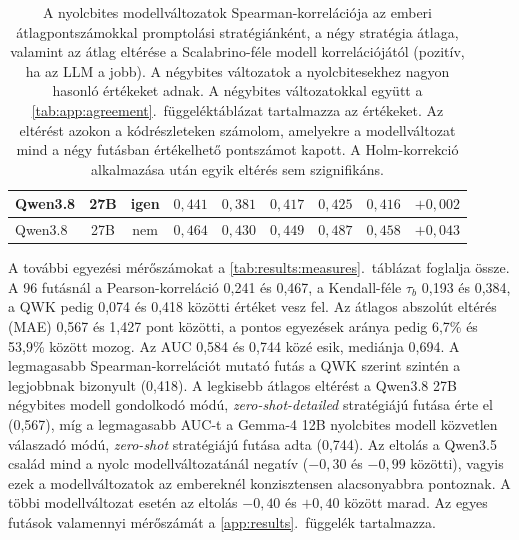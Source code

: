 \documentclass[
]{elteikthesis}[2024/04/26]
\begin{document}
\begin{table}[htbp]
{\begin{tabular}{ | l | c | c | r | r | r | r | r | r | }
		\hline
		Qwen3.8 & 27B & igen & $0{,}441$ & $0{,}381$ & $0{,}417$ & $0{,}425$ & $0{,}416$ & $+0{,}002$ \\
		\hline
		Qwen3.8 & 27B & nem & $0{,}464$ & $0{,}430$ & $0{,}449$ & $0{,}487$ & $0{,}458$ & $+0{,}043$ \\
		\hline
	\end{tabular}}
	\caption[A modellváltozatok Spearman-korrelációja]{A nyolcbites modellváltozatok Spearman-korrelációja az emberi
	átlagpontszámokkal promptolási stratégiánként, a négy stratégia átlaga, valamint az átlag eltérése a
	Scalabrino-féle modell korrelációjától (pozitív, ha az LLM a jobb).
	A négybites változatok a nyolcbitesekhez nagyon hasonló értékeket adnak. A négybites változatokkal
	együtt a \ref{tab:app:agreement}.~függeléktáblázat tartalmazza az értékeket.
	Az eltérést azokon a kódrészleteken számolom, amelyekre a modellváltozat mind a négy futásban
	értékelhető pontszámot kapott.
	A Holm-korrekció alkalmazása után egyik eltérés sem szignifikáns.}
	\label{tab:results:agreement}
\end{table}

A további egyezési mérőszámokat a \ref{tab:results:measures}.~táblázat foglalja
össze. A 96 futásnál a Pearson-korreláció 0,241 és 0,467, a Kendall-féle
$\tau_b$ 0,193 és 0,384, a QWK pedig 0,074 és 0,418 közötti értéket vesz fel. Az
átlagos abszolút eltérés (MAE) 0,567 és 1,427 pont közötti, a pontos egyezések
aránya pedig 6,7\% és 53,9\% között mozog. Az AUC 0,584 és 0,744 közé esik,
mediánja 0,694. A legmagasabb Spearman-korrelációt mutató futás a QWK szerint
szintén a legjobbnak bizonyult (0,418). A legkisebb átlagos eltérést a Qwen3.8
27B négybites modell gondolkodó módú, \textit{zero-shot-detailed} stratégiájú
futása érte el (0,567), míg a legmagasabb AUC-t a Gemma-4 12B nyolcbites modell
közvetlen válaszadó módú, \textit{zero-shot} stratégiájú futása adta (0,744). Az
eltolás a Qwen3.5 család mind a nyolc modellváltozatánál negatív ($-0{,}30$ és
$-0{,}99$ közötti), vagyis ezek a modellváltozatok az embereknél konzisztensen
alacsonyabbra pontoznak. A többi modellváltozat esetén az eltolás $-0{,}40$ és
$+0{,}40$ között marad. Az egyes futások valamennyi mérőszámát a
\ref{app:results}.~függelék tartalmazza.
\end{document}
